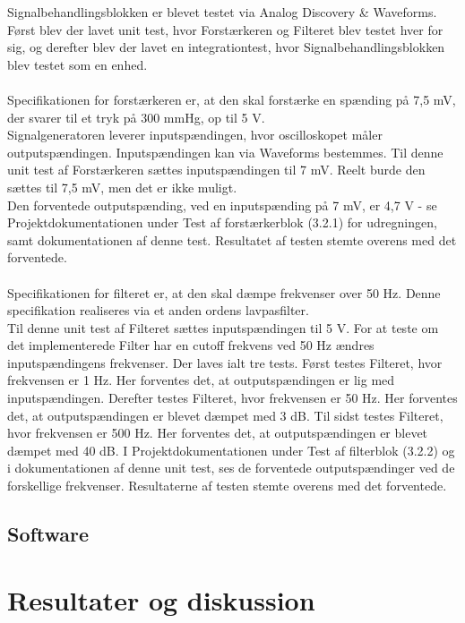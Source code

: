 Signalbehandlingsblokken er blevet testet via Analog Discovery \& Waveforms. Først blev der lavet unit test, hvor Forstærkeren og Filteret blev testet hver for sig, og derefter blev der lavet en integrationtest, hvor Signalbehandlingsblokken blev testet som en enhed. 
\\\\
Specifikationen for forstærkeren er, at den skal forstærke en spænding på 7,5 mV, der svarer til et tryk på 300 mmHg, op til 5 V. \\
Signalgeneratoren leverer inputspændingen, hvor oscilloskopet måler outputspændingen. Inputspændingen kan via Waveforms bestemmes. Til denne unit test af Forstærkeren sættes inputspændingen til 7 mV. Reelt burde den sættes til 7,5 mV, men det er ikke muligt. \\
Den forventede outputspænding, ved en inputspænding på 7 mV, er 4,7 V - se Projektdokumentationen under Test af forstærkerblok (3.2.1) for udregningen, samt dokumentationen af denne test.
Resultatet af testen stemte overens med det forventede. 
\\\\
Specifikationen for filteret er, at den skal dæmpe frekvenser over 50 Hz. Denne specifikation realiseres via et anden ordens lavpasfilter. \\
Til denne unit test af Filteret sættes inputspændingen til 5 V. For at teste om det implementerede Filter har en cutoff frekvens ved 50 Hz ændres inputspændingens frekvenser. Der laves ialt tre tests. Først testes Filteret, hvor frekvensen er 1 Hz. Her forventes det, at outputspændingen er lig med inputspændingen. Derefter testes Filteret, hvor frekvensen er 50 Hz. Her forventes det, at outputspændingen er blevet dæmpet med 3 dB. Til sidst testes Filteret, hvor frekvensen er 500 Hz. Her forventes det, at outputspændingen er blevet dæmpet med 40 dB. I Projektdokumentationen under Test af filterblok (3.2.2) og i dokumentationen af denne unit test, ses de forventede outputspændinger ved de forskellige frekvenser.
Resultaterne af testen stemte overens med det forventede.  

    
 
 


 

\subsection{Software}

\section{Resultater og diskussion}


